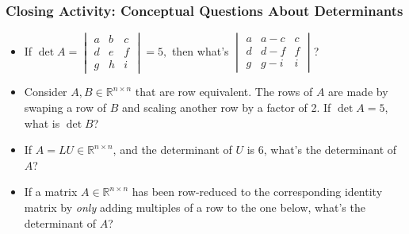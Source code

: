 \documentclass{beamer}
\begin{document}
\begin{frame}
	\frametitle{Closing Activity: Conceptual Questions About Determinants}
	\begin{itemize}
		\item If \(\det A = \begin{vmatrix}a & b & c \\ d & e & f \\ g & h & i\end{vmatrix} = 5,\) then what's \(\begin{vmatrix}a & a - c & c \\ d & d - f & f \\ g & g- i & i\end{vmatrix}\)? \pause 
		\item Consider \(A, B \in \mathbb{R}^{n \times n}\) that are row equivalent. The rows of \(A\) are made by swaping a row of \(B\) and scaling another row by a factor of 
			2. If \(\det A = 5\), what is \(\det B\)? \pause
		\item If \(A = LU \in \mathbb{R}^{n \times n}\), and the determinant of \(U\) is 6, what's the determinant of \(A\)? \pause
		\item If a matrix \(A \in \mathbb{R}^{n \times n}\) has been row-reduced to the corresponding identity matrix by \emph{only} adding multiples of a row to the one below,
			what's the determinant of \(A\)? \pause
	\end{itemize}
\end{frame}
\end{document}
